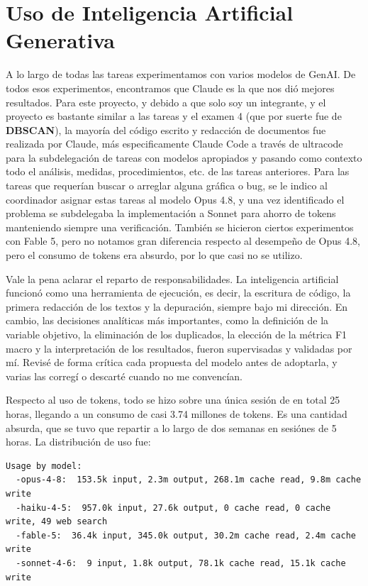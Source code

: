 \documentclass[11pt,letterpaper]{article}
\begin{document}
\section{Uso de Inteligencia Artificial Generativa}

A lo largo de todas las tareas experimentamos con varios modelos de GenAI. De todos
esos experimentos, encontramos que Claude es la que nos dió mejores resultados. Para 
este proyecto, y debido a que solo soy un integrante, y el proyecto es bastante similar
a las tareas y el examen 4 (que por suerte fue de \textbf{DBSCAN}), la mayoría del
código escrito y redacción de documentos fue realizada por Claude, más especificamente
Claude Code a través de ultracode para la subdelegación de tareas con modelos apropiados y 
pasando como contexto todo el análisis, medidas, procedimientos, etc. de las tareas anteriores.
Para las tareas que requerían buscar o arreglar alguna gráfica o bug, se le indico al
coordinador asignar estas tareas al modelo Opus 4.8, y una vez identificado el problema
se subdelegaba la implementación a Sonnet para ahorro de tokens manteniendo siempre una
verificación. También se hicieron ciertos experimentos con Fable 5, pero no notamos gran
diferencia respecto al desempeño de Opus 4.8, pero el consumo de tokens era absurdo, por lo que
casi no se utilizo.

Vale la pena aclarar el reparto de responsabilidades. La inteligencia artificial
funcionó como una herramienta de ejecución, es decir, la escritura de código, la
primera redacción de los textos y la depuración, siempre bajo mi dirección. En
cambio, las decisiones analíticas más importantes, como la definición de la
variable objetivo, la eliminación de los duplicados, la elección de la métrica
F1 macro y la interpretación de los resultados, fueron supervisadas y validadas
por mí. Revisé de forma crítica cada propuesta del modelo antes de adoptarla, y
varias las corregí o descarté cuando no me convencían.

Respecto al uso de tokens, todo se hizo sobre una única sesión de en total 25 horas,
llegando a un consumo de casi 3.74 millones de tokens. Es una cantidad absurda, que se tuvo
que repartir a lo largo de dos semanas en sesiónes de 5 horas. La distribución de uso fue:

\begin{verbatim}
Usage by model:
  -opus-4-8:  153.5k input, 2.3m output, 268.1m cache read, 9.8m cache write
  -haiku-4-5:  957.0k input, 27.6k output, 0 cache read, 0 cache write, 49 web search
  -fable-5:  36.4k input, 345.0k output, 30.2m cache read, 2.4m cache write
  -sonnet-4-6:  9 input, 1.8k output, 78.1k cache read, 15.1k cache write
\end{verbatim}
\end{document}
